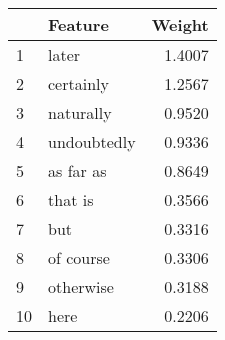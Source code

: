 \begin{tabular}{llr}
\toprule
{} &      Feature &  Weight \\
\midrule
1  &        later &  1.4007 \\
2  &    certainly &  1.2567 \\
3  &    naturally &  0.9520 \\
4  &  undoubtedly &  0.9336 \\
5  &    as far as &  0.8649 \\
6  &      that is &  0.3566 \\
7  &          but &  0.3316 \\
8  &    of course &  0.3306 \\
9  &    otherwise &  0.3188 \\
10 &         here &  0.2206 \\
\bottomrule
\end{tabular}

